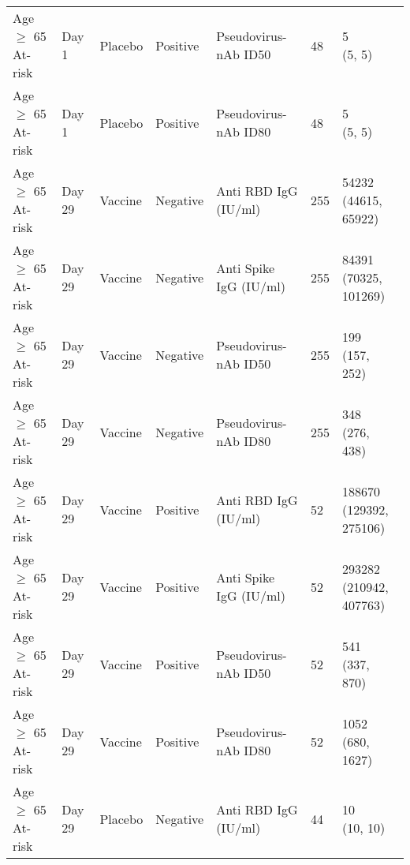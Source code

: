 \documentclass[]{book}
\theoremstyle{definition}
\theoremstyle{definition}
\theoremstyle{definition}
\newcommand{\1}{\mathbbm{1}}
\begin{document}
\begin{landscape}
\begin{ThreePartTable}
\begin{longtable}[t]{>{\raggedright\arraybackslash}p{7cm}llllll}
\hspace{1em}Age $\geq$ 65 At-risk & Day 1 & Placebo & Positive & Pseudovirus-nAb ID50 & 48 & \makecell[l]{5\\(5, 5)}\\
\hspace{1em}Age $\geq$ 65 At-risk & Day 1 & Placebo & Positive & Pseudovirus-nAb ID80 & 48 & \makecell[l]{5\\(5, 5)}\\
\hspace{1em}Age $\geq$ 65 At-risk & Day 29 & Vaccine & Negative & Anti RBD IgG (IU/ml) & 255 & \makecell[l]{54232\\(44615, 65922)}\\
\hspace{1em}Age $\geq$ 65 At-risk & Day 29 & Vaccine & Negative & Anti Spike IgG (IU/ml) & 255 & \makecell[l]{84391\\(70325, 101269)}\\
\hspace{1em}Age $\geq$ 65 At-risk & Day 29 & Vaccine & Negative & Pseudovirus-nAb ID50 & 255 & \makecell[l]{199\\(157, 252)}\\
\hspace{1em}Age $\geq$ 65 At-risk & Day 29 & Vaccine & Negative & Pseudovirus-nAb ID80 & 255 & \makecell[l]{348\\(276, 438)}\\
\hspace{1em}Age $\geq$ 65 At-risk & Day 29 & Vaccine & Positive & Anti RBD IgG (IU/ml) & 52 & \makecell[l]{188670\\(129392, 275106)}\\
\hspace{1em}Age $\geq$ 65 At-risk & Day 29 & Vaccine & Positive & Anti Spike IgG (IU/ml) & 52 & \makecell[l]{293282\\(210942, 407763)}\\
\hspace{1em}Age $\geq$ 65 At-risk & Day 29 & Vaccine & Positive & Pseudovirus-nAb ID50 & 52 & \makecell[l]{541\\(337, 870)}\\
\hspace{1em}Age $\geq$ 65 At-risk & Day 29 & Vaccine & Positive & Pseudovirus-nAb ID80 & 52 & \makecell[l]{1052\\(680, 1627)}\\
\hspace{1em}Age $\geq$ 65 At-risk & Day 29 & Placebo & Negative & Anti RBD IgG (IU/ml) & 44 & \makecell[l]{10\\(10, 10)}\\

\end{longtable}
\end{ThreePartTable}
\end{landscape}
\end{document}
